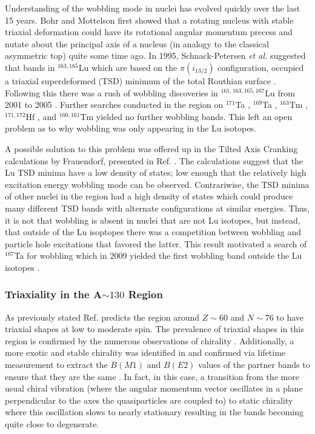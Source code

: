 Understanding of the wobbling mode in nuclei has evolved quickly over the last 15 years. Bohr and Mottelson first showed that a rotating nucleus with stable triaxial deformation could have its rotational angular momentum precess and nutate about the principal axis of a nucleus \cite{bohrMottelson2} (in analogy to the classical asymmetric top) quite some time ago. In 1995, Schnack-Petersen \emph{et al.} suggested that bands in $^{163,165}$Lu which are based on the $\pi{}(i_{13/2})$ configuration, occupied a triaxial superdeformed (TSD) minimum of the total Routhian surface \cite{tsdLutetium}. Following this there was a rush of wobbling discoveries in $^{161,163,165,167}$Lu from 2001 to 2005 \cite{wobblingIn163Lu,wobblingIn163LuTwoPhonon,wobblingIn165Lu,wobblingIn167Lu,wobblingIn161Lu}. Further searches conducted in the region on $^{171}$Ta \cite{wobbSearch171Ta}, $^{169}$Ta \cite{wobbSearch169Ta}, $^{163}$Tm \cite{wobbSearch163Tm}, $^{171,172}$Hf \cite{wobbSearch1712Hf}, and $^{160,161}$Tm \cite{wobbSearch1601Tm} yielded no further wobbling bands. This left an open problem as to why wobbling was only appearing in the Lu isotopes.

A possible solution to this problem was offered up in the Tilted Axis Cranking calculations by Frauendorf, presented in Ref. \cite{wobbSearch163Tm}. The calculations suggest that the Lu TSD minima have a low density of states; low enough that the relatively high excitation energy wobbling mode can be observed. Contrariwise, the TSD minima of other nuclei in the region had a high density of states which could produce many different TSD bands with alternate configurations at similar energies. Thus, it is not that wobbling is absent in nuclei that are not Lu isotopes, but instead, that outside of the Lu isoptopes there was a competition between wobbling and particle hole excitations that favored the latter. This result motivated a search of $^{167}$Ta for wobbling which in 2009 yielded the first wobbling band outside the Lu isotopes \cite{wobblingIn167Ta}.

\subsubsection{Triaxiality in the A$\sim{}130$ Region}
\label{sec:trw-triax}
As previously stated Ref. \cite{groundStateTriax} predicts the region around $Z\sim{}60$ and $N\sim{}76$ to have triaxial shapes at low to moderate spin. The prevalence of triaxial shapes in this region is confirmed by the numerous observations of chirality \cite{chiralityIn134Pr,chiralityA130Region,chiralityUpperA130Region,chiralityA130Region2,chirality136Pm,chiralityMore135Nd,chiralityIn135Nd,chiralityMulti133Cs}. Additionally, a more exotic and stable chirality was identified in \cite{chiralityMore135Nd,chiralityIn135Nd} and confirmed via lifetime measurement to extract the $B(M1)$ and $B(E2)$ values of the partner bands to ensure that they are the same \cite{chiralityIn135Nd}. In fact, in this case, a transition from the more usual chiral vibration (where the angular momentum vector oscillates in a plane perpendicular to the axes the quasiparticles are coupled to) to static chirality where this oscillation slows to nearly stationary resulting in the bands becoming quite close to degenerate.

